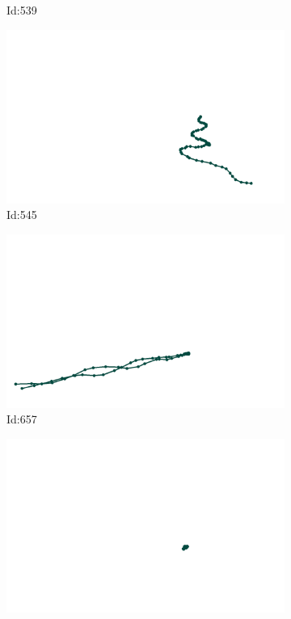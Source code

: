 \documentclass[12pt,twoside]{report}
\begin{document}
\begin{figure}
\begin{subfigure}[b]{0.20\textwidth}
\caption{Id:539}
\end{subfigure}
\begin{subfigure}[b]{0.20\textwidth}
\centering
\includegraphics[width=\textwidth]{../trajectories/545.png}
\caption{Id:545}
\end{subfigure}
\begin{subfigure}[b]{0.20\textwidth}
\centering
\includegraphics[width=\textwidth]{../trajectories/657.png}
\caption{Id:657}
\end{subfigure}
\begin{subfigure}[b]{0.20\textwidth}
\centering
\includegraphics[width=\textwidth]{../trajectories/664.png}

\end{subfigure}
\end{figure}
\end{document}
